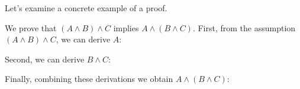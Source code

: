 Let's examine a concrete example of a proof.
\begin{example}
  We prove that $(A \land B) \land C$ implies $A \land (B \land C)$.
  First, from the assumption $(A \land B) \land C$, we can derive $A$:
  \begin{prooftree}
  \end{prooftree}
  Second, we can derive $B \land C$:
  \begin{prooftree}
  \end{prooftree}
  Finally, combining these derivations we obtain $A \land (B \land C)$:
  \begin{prooftree}
  \end{prooftree}
\end{example}
